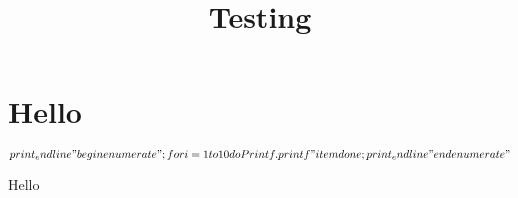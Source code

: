 \documentclass{article}
\begin{document}
\title{Testing}

\maketitle

\section{Hello}

$${
print_endline "\\begin{enumerate}" ;
for i = 1 to 10 do
  Printf.printf "\\item %
done ;
print_endline "\\end{enumerate}"
}$$

Hello
\end{document}
